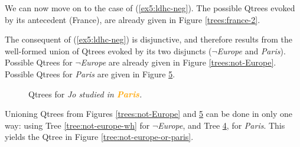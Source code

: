 We can now move on to the case of (\ref{ex5:ldhc-neg}). The possible Qtrees evoked by its antecedent (France), are already given in Figure \ref{trees:france-2}.


The consequent of (\ref{ex5:ldhc-neg}) is disjunctive, and therefore results from the well-formed union of Qtrees evoked by its two disjuncts ($\neg$\textit{Europe} and \textit{Paris}). Possible Qtrees for $\neg$\textit{Europe} are already given in Figure \ref{trees:not-Europe}. Possible Qtrees for \textit{Paris} are given in Figure \ref{trees:paris}.

\begin{figure}[H]
	\centering
	\begin{subfigure}[b]{.3\linewidth}
		\centering
		\caption{}\label{tree:paris-polar}
	\end{subfigure}
	\hfill
	\begin{subfigure}[b]{.3\linewidth}
		\centering
		\caption{}\label{tree:paris-wh}
	\end{subfigure}\hfill
	\begin{subfigure}[b]{.3\linewidth}
		\centering
		\caption{}\label{tree:paris-tiered}
	\end{subfigure}
	\begin{subfigure}[b]{.3\linewidth}
		\centering
		\caption{}\label{tree:paris-tiered-tiered}
	\end{subfigure}
	
	
	\caption{Qtrees for \textit{Jo studied in \textbf{\textcolor{orange}{Paris}}.}}\label{trees:paris}
\end{figure}

Unioning Qtrees from Figures \ref{trees:not-Europe} and \ref{trees:paris} can be done in only one way: using Tree \ref{tree:not-europe-wh} for $\neg$\textit{Europe}, and Tree \ref{tree:paris-tiered-tiered}, for \textit{Paris}. This yields the Qtree in Figure \ref{tree:not-europe-or-paris}.

